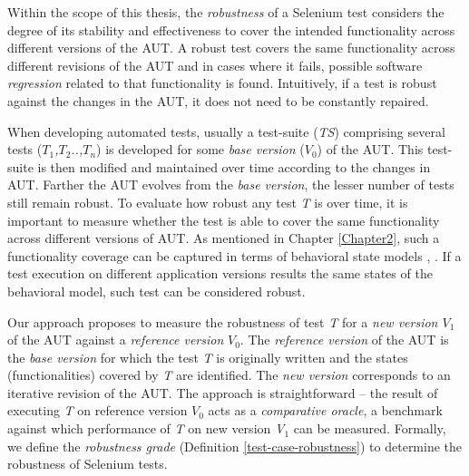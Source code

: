 Within the scope of this thesis, the \textit{robustness} of a Selenium test considers the degree of its stability and effectiveness to cover the intended functionality across different versions of the AUT. A robust test covers the same functionality across different revisions of the AUT and in cases where it fails, possible software \textit{regression} related to that functionality is found. Intuitively, if a test is robust against the changes in the AUT, it does not need to be constantly repaired.



  


When developing automated tests, usually a test-suite (\textit{TS}) comprising several tests (\textit{$T_1$,$T_2$..,$T_n$}) is developed for some \textit{base version} (\textit{$V_{0}$}) of the AUT. This test-suite is then modified and maintained over time according to the changes in AUT. Farther the AUT evolves from the \textit{base version}, the lesser number of tests still remain robust. To evaluate how robust any test \textit{T} is over time, it is important to measure whether the test is able to cover the same functionality across different versions of AUT. As mentioned in Chapter \ref{Chapter2}, such a functionality coverage can be captured in terms of behavioral state models \cite{marchettoStateBased}, \cite{SchurMiningBehavModels}. If a test execution on different application versions results the same states of the behavioral model, such test can be considered robust.

Our approach proposes to measure the robustness of test \textit{T} for a \textit{new version $V_{1}$} of the AUT against a \textit{reference version} \textit{$V_{0}$}. The \textit{reference version} of the AUT is the \textit{base version} for which the test \textit{T} is originally written and the states (functionalities) covered by \textit{T} are identified. The \textit{new version} corresponds to an iterative revision of the AUT. The approach is straightforward -- the result of executing \textit{T} on reference version \textit{$V_{0}$} acts as a \textit{comparative oracle}, a benchmark against which performance of \textit{T} on new version \textit{V$_{1}$} can be measured. Formally, we define the \textit{
robustness grade} (Definition \ref{test-case-robustness}) to determine the robustness of Selenium tests. 

